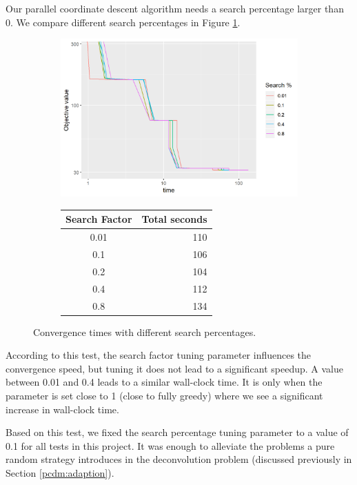 Our parallel coordinate descent algorithm needs a search percentage larger than 0. We compare different search percentages in Figure \ref{pcdm:results:search}.

\begin{figure}[h]
	\centering
	\begin{subfigure}{0.6\linewidth}
		\includegraphics[width=1.0\linewidth]{./chapters/05.pcdm/parameters/searchPercent.png}
	\end{subfigure}
	\begin{subfigure}{0.35\linewidth}
		\begin{tabular}{c | r}
			Search Factor & Total seconds \\ \hline
			0.01 & 110 \\
			0.1 & 106 \\
			0.2 & 104 \\
			0.4 & 112 \\
			0.8 & 134 \\
		\end{tabular}
	\end{subfigure}
	\caption{Convergence times with different search percentages.}
	\label{pcdm:results:search}
\end{figure}

According to this test, the search factor tuning parameter influences the convergence speed, but tuning it does not lead to a significant speedup. A value between 0.01 and 0.4 leads to a similar wall-clock time. It is only when the parameter is set close to 1 (close to fully greedy) where we see a significant increase in wall-clock time.

Based on this test, we fixed the search percentage tuning parameter to a value of 0.1 for all tests in this project. It was enough to alleviate the problems a pure random strategy introduces in the deconvolution problem (discussed previously in Section \ref{pcdm:adaption}).


